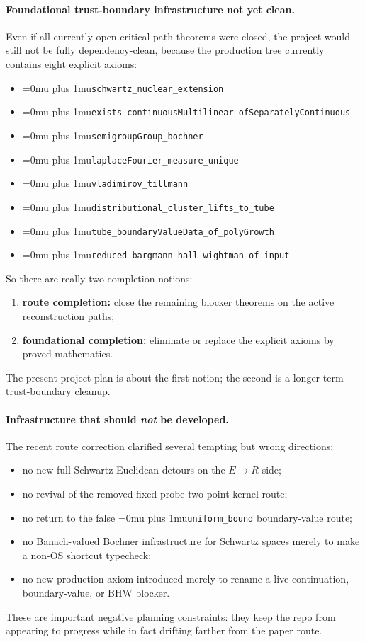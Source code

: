 \documentclass[11pt,a4paper]{article}
\newcommand{\leanname}[1]{\begingroup\Urlmuskip=0mu plus 1mu\relax\nolinkurl{#1}\endgroup}
\begin{document}
\paragraph{Foundational trust-boundary infrastructure not yet clean.}
Even if all currently open critical-path theorems were closed, the project would
still not be fully dependency-clean, because the production tree currently
contains eight explicit axioms:
\begin{itemize}
\item \leanname{schwartz\_nuclear\_extension}
\item \leanname{exists\_continuousMultilinear\_ofSeparatelyContinuous}
\item \leanname{semigroupGroup\_bochner}
\item \leanname{laplaceFourier\_measure\_unique}
\item \leanname{vladimirov\_tillmann}
\item \leanname{distributional\_cluster\_lifts\_to\_tube}
\item \leanname{tube\_boundaryValueData\_of\_polyGrowth}
\item \leanname{reduced\_bargmann\_hall\_wightman\_of\_input}
\end{itemize}
So there are really two completion notions:
\begin{enumerate}
\item \textbf{route completion:} close the remaining blocker theorems on the
  active reconstruction paths;
\item \textbf{foundational completion:} eliminate or replace the explicit axioms
  by proved mathematics.
\end{enumerate}
The present project plan is about the first notion; the second is a longer-term
trust-boundary cleanup.

\paragraph{Infrastructure that should \emph{not} be developed.}
The recent route correction clarified several tempting but wrong directions:
\begin{itemize}
\item no new full-Schwartz Euclidean detours on the $E \to R$ side;
\item no revival of the removed fixed-probe two-point-kernel route;
\item no return to the false \leanname{uniform\_bound} boundary-value route;
\item no Banach-valued Bochner infrastructure for Schwartz spaces merely to make
  a non-OS shortcut typecheck;
\item no new production axiom introduced merely to rename a live continuation,
  boundary-value, or BHW blocker.
\end{itemize}
These are important negative planning constraints: they keep the repo from
appearing to progress while in fact drifting farther from the paper route.
\end{document}
